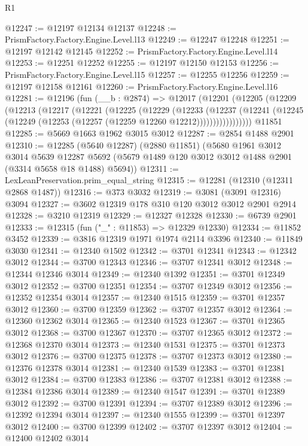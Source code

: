 \begin{lexlean}{R1}
\begin{coremodule}
@12247 := @12197 @12134 @12137
@12248 := PrismFactory.Factory.Engine.Level.l13
@12249 := @12247 @12248
@12251 := @12197 @12142 @12145
@12252 := PrismFactory.Factory.Engine.Level.l14
@12253 := @12251 @12252
@12255 := @12197 @12150 @12153
@12256 := PrismFactory.Factory.Engine.Level.l15
@12257 := @12255 @12256
@12259 := @12197 @12158 @12161
@12260 := PrismFactory.Factory.Engine.Level.l16
@12281 := @12196
    (fun (__b : @2874) =>
    @12017
      (@12201
        (@12205
          (@12209
            (@12213
              (@12217
                (@12221
                  (@12225
                    (@12229
                      (@12233
                        (@12237
                          (@12241
                            (@12245 (@12249 (@12253 (@12257 (@12259 @12260 @12212)))))))))))))))))
    @11851
@12285 := @5669 @1663 @1962 @3015 @3012
@12287 := @2854 @1488 @2901
@12310 := @12285
    (@5640 @12287)
    (@2880 @11851)
    (@5680
      @1961
      @3012
      @3014
      @5639
      @12287
      @5692
      (@5679 @1489 @120 @3012 @3012 @1488 @2901 (@3314 @5658 @18 @1488) @5694))
@12311 := LexLeanPreservation.prim_equal_string
@12315 := @12281 (@12310 (@12311 @2868 @1487))
@12316 := @373 @3032
@12319 := @3081 (@3091 @12316) @3094
@12327 := @3602 @12319 @178 @310 @120 @3012 @3012 @2901 @2914
@12328 := @3210 @12319
@12329 := @12327 @12328
@12330 := @6739 @2901
@12333 := @12315 (fun ("_" : @11853) => @12329 @12330)
@12334 := @11852 @3452
@12339 := @3816 @12319 @1971 @1974 @2114 @3396
@12340 := @11849 @3030
@12341 := @12340 @1502
@12342 := @3701 @12341
@12343 := @12342 @3012
@12344 := @3700 @12343
@12346 := @3707 @12341 @3012
@12348 := @12344 @12346 @3014
@12349 := @12340 @1392
@12351 := @3701 @12349 @3012
@12352 := @3700 @12351
@12354 := @3707 @12349 @3012
@12356 := @12352 @12354 @3014
@12357 := @12340 @1515
@12359 := @3701 @12357 @3012
@12360 := @3700 @12359
@12362 := @3707 @12357 @3012
@12364 := @12360 @12362 @3014
@12365 := @12340 @1523
@12367 := @3701 @12365 @3012
@12368 := @3700 @12367
@12370 := @3707 @12365 @3012
@12372 := @12368 @12370 @3014
@12373 := @12340 @1531
@12375 := @3701 @12373 @3012
@12376 := @3700 @12375
@12378 := @3707 @12373 @3012
@12380 := @12376 @12378 @3014
@12381 := @12340 @1539
@12383 := @3701 @12381 @3012
@12384 := @3700 @12383
@12386 := @3707 @12381 @3012
@12388 := @12384 @12386 @3014
@12389 := @12340 @1547
@12391 := @3701 @12389 @3012
@12392 := @3700 @12391
@12394 := @3707 @12389 @3012
@12396 := @12392 @12394 @3014
@12397 := @12340 @1555
@12399 := @3701 @12397 @3012
@12400 := @3700 @12399
@12402 := @3707 @12397 @3012
@12404 := @12400 @12402 @3014

\end{coremodule}
\end{lexlean}
